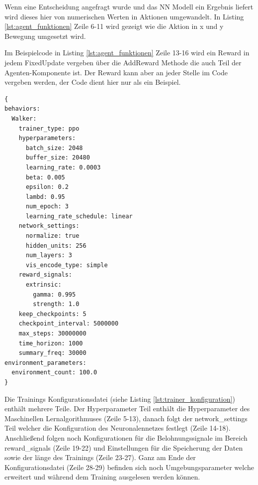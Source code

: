 Wenn eine Entscheidung angefragt wurde und das NN Modell ein Ergebnis liefert wird dieses hier von numerischen Werten in Aktionen umgewandelt. In Listing \ref{lst:agent_funktionen} Zeile 6-11 wird gezeigt wie die Aktion in x und y Bewegung umgesetzt wird.

Im Beispielcode in Listing \ref{lst:agent_funktionen} Zeile 13-16 wird ein Reward in jedem FixedUpdate vergeben über die AddReward Methode die auch Teil der Agenten-Komponente ist. Der Reward kann aber an jeder Stelle im Code vergeben werden, der Code dient hier nur als ein Beispiel.

\begin{lstlisting}[caption={Trainer Konfigurationsdatei},captionpos=b,label={lst:trainer_konfiguration}]
{
behaviors:
  Walker:
    trainer_type: ppo
    hyperparameters:
      batch_size: 2048
      buffer_size: 20480
      learning_rate: 0.0003
      beta: 0.005
      epsilon: 0.2
      lambd: 0.95
      num_epoch: 3
      learning_rate_schedule: linear
    network_settings:
      normalize: true
      hidden_units: 256
      num_layers: 3
      vis_encode_type: simple
    reward_signals:
      extrinsic:
        gamma: 0.995
        strength: 1.0
    keep_checkpoints: 5
    checkpoint_interval: 5000000
    max_steps: 30000000
    time_horizon: 1000
    summary_freq: 30000
environment_parameters:
  environment_count: 100.0
}
\end{lstlisting}

Die Trainings Konfigurationsdatei (siehe Listing \ref{lst:trainer_konfiguration}) enthält mehrere Teile. Der Hyperparameter Teil enthält die Hyperparameter des Maschinellen Lernalgorithmuses (Zeile 5-13), danach folgt der network\_settings Teil welcher die Konfiguration des Neuronalennetzes festlegt (Zeile 14-18). Anschließend folgen noch Konfigurationen für die Belohnungssignale im Bereich reward\_signals (Zeile 19-22) und Einstellungen für die Speicherung der Daten sowie der länge des Trainings (Zeile 23-27). Ganz am Ende der Konfigurationsdatei (Zeile 28-29) befinden sich noch Umgebungsparameter welche erweitert und während dem Training ausgelesen werden können.

